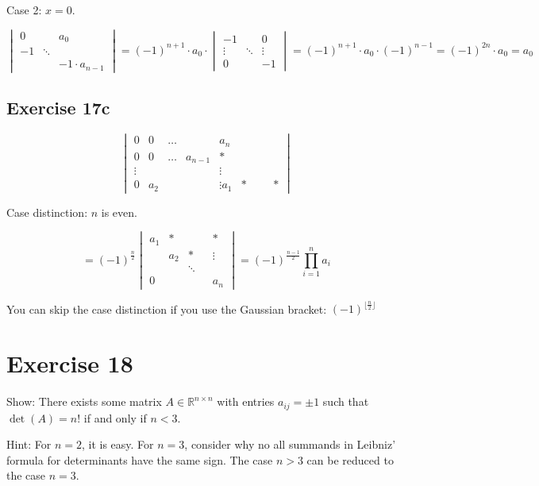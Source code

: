 \documentclass[a4paper]{article}
\theoremstyle{definition}
\begin{document}
Case 2: $x = 0$.

\[
  \begin{vmatrix}
    0 &         & a_0 \\
    -1 & \ddots & \\
       &        & -1\cdot a_{n-1}
  \end{vmatrix}
  = (-1)^{n+1} \cdot a_0 \cdot
  \begin{vmatrix}
    -1     &        & 0 \\
    \vdots & \ddots & \vdots \\
    0      &        & -1
  \end{vmatrix}
  = (-1)^{n+1} \cdot a_0 \cdot (-1)^{n-1} = (-1)^{2n} \cdot a_0 = a_0
\]

\subsection{Exercise 17c}
\begin{ex}
  \[
    \begin{vmatrix}
      0 & 0 & \ldots &         & a_n \\
      0 & 0 & \ldots & a_{n-1} & * \\
      \vdots & & & & \vdots \\
      0 & a_2 & & & \vdots
      a_1 & * & & & *
    \end{vmatrix}
  \]
\end{ex}

Case distinction: $n$ is even.

\[
  = (-1)^{\frac n2} \begin{vmatrix}
    a_1 & *   &   & & * \\
        & a_2 & * & & \vdots \\
        &     & \ddots & & \\
    0   &     &        & & a_n
  \end{vmatrix}
  = (-1)^{\frac{n-1}{2}} \prod_{i=1}^n a_i
\]

You can skip the case distinction if you use the Gaussian bracket: $(-1)^{\lfloor \frac n2\rfloor}$

\section{Exercise 18}
\begin{ex}
  Show: There exists some matrix $A \in \mathbb R^{n\times n}$ with entries $a_{ij} = \pm 1$ such that $\det(A) = n!$ if and only if $n < 3$.

  Hint: For $n=2$, it is easy. For $n=3$, consider why no all summands in Leibniz' formula for determinants have the same sign. The case $n>3$ can be reduced to the case $n=3$.
\end{ex}
\end{document}
